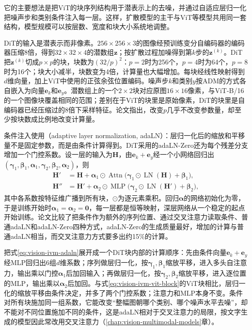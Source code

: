 它的主要想法是把ViT的块序列结构用于潜表示上的去噪，并通过自适应层归一化把噪声步和类别条件注入每一层。这样，扩散模型的主干与ViT等模型共用同一套结构，模型规模可以按层数、宽度和块大小系统地调整。

DiT的输入是潜表示而非像素。$256\times256\times3$的图像经预训练变分自编码器的编码器压缩8倍，得到$32\times32\times4$的潜数组$\bm z$；按扩散过程加噪得到第$k$步的$\bm z^{(k)}$。DiT把$\bm z^{(k)}$切成$p\times p$的块，块数为$(32/p)^2$：$p=2$时为256个，$p=4$时为64个，$p=8$时为16个；块大小减半，块数变为4倍，计算量也大幅增加。每块经线性映射得到$d$维向量，加上ViT中使用的正弦余弦位置编码。噪声步$k$和类别$y$按ADM的方式各自嵌入为向量$\bm e_k$和$\bm e_y$。潜数组上的一个$2\times2$块对应原图$16\times16$像素，与ViT-B/16的一个图像块覆盖相同的范围；差别在于ViT的块里是原始像素，DiT的块里是自编码器已经压缩过的8倍下采样特征。论文指出，改变$p$几乎不改变参数量，却至少按块数成比例地改变计算量。

条件注入使用（adaptive layer normalization, adaLN）：层归一化后的缩放和平移量不是固定参数，而是由条件计算得到。DiT采用的adaLN-Zero还为每个残差分支增加一个门控系数。设一层的输入为$\bm H$，由$\bm e_k+\bm e_y$经一个小网络回归出$(\bm\gamma_1,\bm\beta_1,\bm\alpha_1,\bm\gamma_2,\bm\beta_2,\bm\alpha_2)$，则
\begin{equation}
  \begin{aligned}
    \bm H'&=\bm H+\bm\alpha_1\odot\operatorname{Attn}\bigl(\bm\gamma_1\odot\operatorname{LN}(\bm H)+\bm\beta_1\bigr),\\
    \bm H''&=\bm H'+\bm\alpha_2\odot\operatorname{MLP}\bigl(\bm\gamma_2\odot\operatorname{LN}(\bm H')+\bm\beta_2\bigr),
  \end{aligned}
  \label{eq:vision-ivm-adaln}
\end{equation}
其中各系数按特征维广播到所有块，$\odot$为逐元素乘积。回归$\bm\alpha$的网络初始化为零，于是训练开始时$\bm\alpha_1=\bm\alpha_2=\bm 0$，每一层都是恒等映射，深层网络从一个稳定的起点开始训练。论文比较了把条件作为额外的序列位置、通过交叉注意力读取条件、普通adaLN和adaLN-Zero四种方式，adaLN-Zero的生成质量最好，增加的计算与普通adaLN相当，而交叉注意力方式要多出约15\%的计算。

把式\eqref{eq:vision-ivm-adaln}展开成一个DiT块内部的计算顺序：先由条件向量$\bm e_k+\bm e_y$经MLP回归出6组$d$维系数；序列做层归一化，按$\bm\gamma_1,\bm\beta_1$缩放平移，进入多头自注意力，输出乘以门控$\bm\alpha_1$后加回输入；再做层归一化，按$\bm\gamma_2,\bm\beta_2$缩放平移，进入逐位置的MLP，输出乘以$\bm\alpha_2$后加回。与式\eqref{eq:vision-ivm-vit-block}的ViT块相比，层归一化的缩放平移由条件决定，并多了两个门控系数；注意力和MLP本身不变。条件对所有块施加同一组系数，它能改变“整幅图朝哪个类别、哪个噪声水平去噪”，却不能对不同位置施加不同的条件，这是adaLN相对于交叉注意力的局限，按文字生成的模型因此常改用交叉注意力（\ref{chap:vision-multimodal-models}章）。

